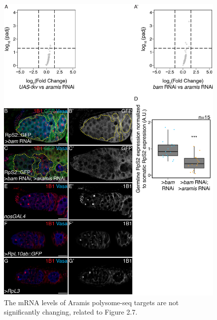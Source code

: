 \documentclass[12pt,oneside]{reedthesis}
\begin{document}
\begin{figure}

{\centering \includegraphics[width=6.5 in,height=8.9375 in]{./figure/Ribosome Biogenesis/Ribosome Biogenesis 4S} 

}

\caption[The mRNA levels of Aramis polysome-seq targets are not significantly changing, related to Figure 2.7.]{The mRNA levels of Aramis polysome-seq targets are not significantly changing, related to Figure 2.7.}\label{fig:unnamed-chunk-13}
\end{figure}
\end{document}
